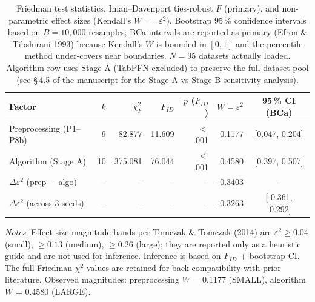 \begin{table}[ht]
\centering
\caption{Friedman test statistics, Iman--Davenport ties-robust $F$ (primary),
and non-parametric effect sizes (Kendall's $W$ $=$ $\varepsilon^2$).
Bootstrap 95\,\% confidence intervals based on $B=10,000$ resamples;
BCa intervals are reported as primary (Efron \& Tibshirani 1993)
because Kendall's $W$ is bounded in $[0,1]$ and the percentile method
under-covers near boundaries.
$N=95$ datasets actually loaded.
Algorithm row uses Stage A (TabPFN excluded) to preserve the full dataset pool
(see \S\,4.5 of the manuscript for the Stage A vs Stage B sensitivity analysis).}
\label{tab:effect_sizes}
\begin{tabular}{lrrrrrc}
\toprule
Factor & $k$ & $\chi^2_F$ & $F_{ID}$ & $p$ ($F_{ID}$) & $W=\varepsilon^2$ & 95\,\% CI (BCa) \\
\midrule
Preprocessing (P1--P8b) & 9 & 82.877 & 11.609 & $<$.001 & 0.1177 & [0.047, 0.204] \\
Algorithm (Stage A)     & 10 & 375.081 & 76.044 & $<$.001 & 0.4580 & [0.397, 0.507] \\
\midrule
$\Delta\varepsilon^2$ (prep $-$ algo) & -- & -- & -- & -- & -0.3403 & -- \\
$\Delta\varepsilon^2$ (across 3 seeds) & -- & -- & -- & -- & -0.3263 & [-0.361, -0.292] \\
\bottomrule
\end{tabular}

\medskip
\footnotesize{
\textit{Notes.}
Effect-size magnitude bands per Tomczak \& Tomczak (2014) are
$\varepsilon^2 \geq 0.04$ (small), $\geq 0.13$ (medium),
$\geq 0.26$ (large); they are reported only as a heuristic guide
and are not used for inference. Inference is based on $F_{ID}$ +
bootstrap CI. The full Friedman $\chi^2$ values are retained for
back-compatibility with prior literature.
Observed magnitudes: preprocessing $W$ = 0.1177 (SMALL),
algorithm $W$ = 0.4580 (LARGE).
}
\end{table}